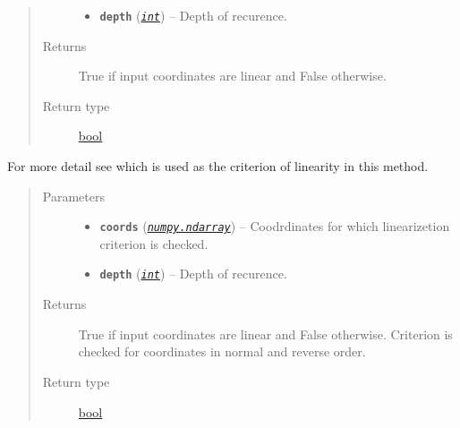 \documentclass[a4paper,10pt,english]{sphinxmanual}
\begin{document}
\begin{fulllineitems}
\begin{fulllineitems}
\begin{quote}
\begin{description}
\begin{itemize}
\item {} 
\textbf{\texttt{depth}} (\href{http://docs.python.org/2/library/functions.html\#int}{\emph{\texttt{int}}}) -- Depth of recurence.

\end{itemize}

\item[{Returns}] \leavevmode
True if input coordinates are linear and False otherwise.

\item[{Return type}] \leavevmode
\href{http://docs.python.org/2/library/functions.html\#bool}{bool}

\end{description}\end{quote}

\end{fulllineitems}


\begin{fulllineitems}
\label{aqueduct.geom.traces:aqueduct.geom.traces.VectorLinearize.is_linear}
For more detail see {\hyperref[aqueduct.geom.traces:aqueduct.geom.traces.VectorLinearize.is_linear_core]{}} which is used as the criterion of linearity in this method.
\begin{quote}\begin{description}
\item[{Parameters}] \leavevmode\begin{itemize}
\item {} 
\textbf{\texttt{coords}} (\href{http://docs.scipy.org/doc/numpy/reference/generated/numpy.ndarray.html\#numpy.ndarray}{\emph{\texttt{numpy.ndarray}}}) -- Coodrdinates for which linearizetion criterion is checked.

\item {} 
\textbf{\texttt{depth}} (\href{http://docs.python.org/2/library/functions.html\#int}{\emph{\texttt{int}}}) -- Depth of recurence.

\end{itemize}

\item[{Returns}] \leavevmode
True if input coordinates are linear and False otherwise. Criterion is checked for coordinates in normal and reverse order.

\item[{Return type}] \leavevmode
\href{http://docs.python.org/2/library/functions.html\#bool}{bool}

\end{description}\end{quote}

\end{fulllineitems}


\end{fulllineitems}
\end{document}
